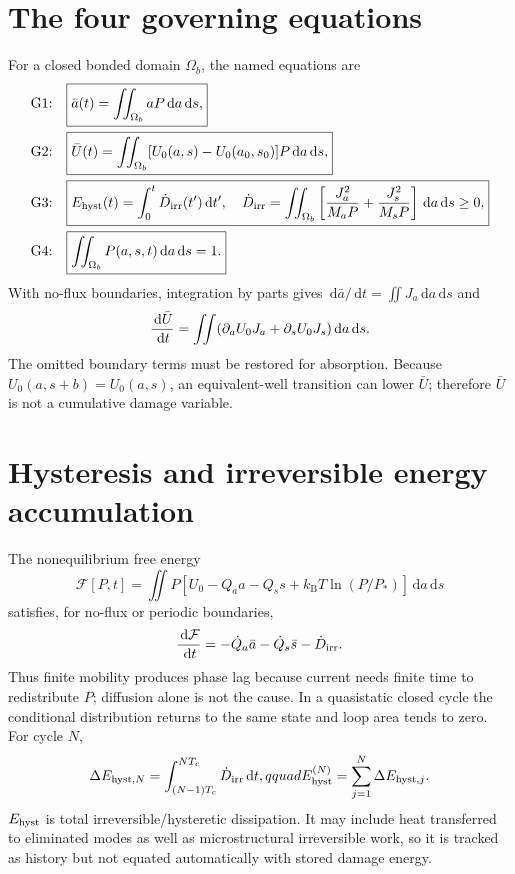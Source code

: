 \documentclass[11pt,letterpaper]{article}
\newcommand{\kB}{k_{\mathrm B}}
\newcommand{\dd}{\,\mathrm d}
\begin{document}
\section{The four governing equations}
\label{sec:four}

For a closed bonded domain $\Omega_b$, the named equations are
\begin{align}
\text{G1:}\quad&\boxed{\bar a(t)=\iint_{\Omega_b}aP\dd a\dd s,}
\label{eq:G1}\\
\text{G2:}\quad&\boxed{\bar U(t)=\iint_{\Omega_b}
[U_0(a,s)-U_0(a_0,s_0)]P\dd a\dd s,}
\label{eq:G2}\\
\text{G3:}\quad&\boxed{E_{\rm hyst}(t)=\int_0^t\dot D_{\rm irr}(t')\dd t',\quad
\dot D_{\rm irr}=\iint_{\Omega_b}\left[{J_a^2\over M_aP}+{J_s^2\over M_sP}\right]
\dd a\dd s\ge0,}
\label{eq:G3}\\
\text{G4:}\quad&\boxed{\iint_{\Omega_b}P(a,s,t)\dd a\dd s=1.}
\label{eq:G4}
\end{align}
With no-flux boundaries, integration by parts gives
$\dd\bar a/\dd t=\iint J_a\dd a\dd s$ and
\begin{equation}
 {\dd\bar U\over\dd t}=\iint(\partial_aU_0J_a+
 \partial_sU_0J_s)\dd a\dd s.
\end{equation}
The omitted boundary terms must be restored for absorption.  Because
$U_0(a,s+b)=U_0(a,s)$, an equivalent-well transition can lower $\bar U$;
therefore $\bar U$ is not a cumulative damage variable.

\section{Hysteresis and irreversible energy accumulation}

The nonequilibrium free energy
\begin{equation}
 \mathcal F[P,t]=\iint P[U_0-Q_a a-Q_s s+\kB T\ln(P/P_*)]\dd a\dd s
\end{equation}
satisfies, for no-flux or periodic boundaries,
\begin{equation}
 {\dd\mathcal F\over\dd t}=-\dot Q_a\bar a-\dot Q_s\bar s-
 \dot D_{\rm irr}.
\end{equation}
Thus finite mobility produces phase lag because current needs finite time to
redistribute $P$; diffusion alone is not the cause.  In a quasistatic closed
cycle the conditional distribution returns to the same state and loop area
tends to zero.  For cycle $N$,
\begin{equation}
 \Delta E_{{\rm hyst},N}=\int_{(N-1)T_c}^{NT_c}\dot D_{\rm irr}\dd t,qquad
 E_{\rm hyst}^{(N)}=\sum_{j=1}^N\Delta E_{{\rm hyst},j}.
\end{equation}
$E_{\rm hyst}$ is total irreversible/hysteretic dissipation.  It may include
heat transferred to eliminated modes as well as microstructural irreversible
work, so it is tracked as history but not equated automatically with stored
damage energy.
\end{document}
